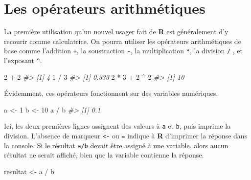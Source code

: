 \documentclass[
]{book}
\newenvironment{Shaded}{}{}
\newcommand{\CommentTok}[1]{\textit{#1}}
\newcommand{\DecValTok}[1]{#1}
\newcommand{\NormalTok}[1]{#1}
\newcommand{\OtherTok}[1]{#1}
\newcommand{\SpecialCharTok}[1]{#1}
\begin{document}
\hypertarget{les-opuxe9rateurs-arithmuxe9tiques}{%
\section{Les opérateurs arithmétiques}\label{les-opuxe9rateurs-arithmuxe9tiques}}

La première utilisation qu'un nouvel usager fait de \textbf{R} est généralement d'y recourir comme calculatrice. On pourra utiliser les opérateurs arithmétiques de base comme l'addition \texttt{+}, la soustraction \texttt{-}, la multiplication \texttt{*}, la division \texttt{/} , et l'exposant \texttt{\^{}}.

\begin{Shaded}
\begin{Highlighting}[]
\DecValTok{2} \SpecialCharTok{+} \DecValTok{2}
\CommentTok{\#\textgreater{} [1] 4}
\DecValTok{1} \SpecialCharTok{/} \DecValTok{3}
\CommentTok{\#\textgreater{} [1] 0.333}
\DecValTok{2} \SpecialCharTok{*} \DecValTok{3} \SpecialCharTok{+} \DecValTok{2} \SpecialCharTok{\^{}} \DecValTok{2}
\CommentTok{\#\textgreater{} [1] 10}
\end{Highlighting}
\end{Shaded}

Évidemment, ces opérateurs fonctionnent sur des variables numériques.

\begin{Shaded}
\begin{Highlighting}[]
\NormalTok{a }\OtherTok{\textless{}{-}} \DecValTok{1}
\NormalTok{b }\OtherTok{\textless{}{-}} \DecValTok{10}
\NormalTok{a }\SpecialCharTok{/}\NormalTok{ b}
\CommentTok{\#\textgreater{} [1] 0.1}
\end{Highlighting}
\end{Shaded}

Ici, les deux premières lignes assignent des valeurs à \texttt{a} et \texttt{b}, puis imprime la division. L'absence de marqueur \texttt{\textless{}-} ou \texttt{=} indique à \textbf{R} d'imprimer la réponse dans la console. Si le résultat \texttt{a/b} devait être assigné à une variable, alors aucun résultat ne serait affiché, bien que la variable contienne la réponse.

\begin{Shaded}
\begin{Highlighting}[]
\NormalTok{resultat }\OtherTok{\textless{}{-}}\NormalTok{ a }\SpecialCharTok{/}\NormalTok{ b}
\end{Highlighting}
\end{Shaded}
\end{document}
